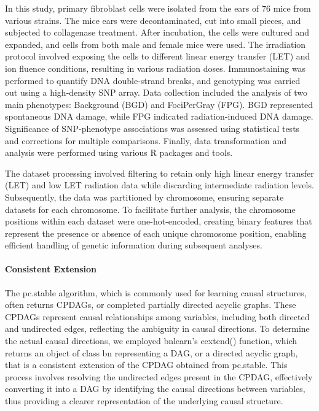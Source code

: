 \documentclass{article}
\begin{document}
In this study, primary fibroblast cells were isolated from the ears of 76 mice from various strains. The mice ears were decontaminated, cut into small pieces, and subjected to collagenase treatment. After incubation, the cells were cultured and expanded, and cells from both male and female mice were used. The irradiation protocol involved exposing the cells to different linear energy transfer (LET) and ion fluence conditions, resulting in various radiation doses. Immunostaining was performed to quantify DNA double-strand breaks, and genotyping was carried out using a high-density SNP array. Data collection included the analysis of two main phenotypes: Background (BGD) and FociPerGray (FPG). BGD represented spontaneous DNA damage, while FPG indicated radiation-induced DNA damage. Significance of SNP-phenotype associations was assessed using statistical tests and corrections for multiple comparisons. Finally, data transformation and analysis were performed using various R packages and tools.

The dataset processing involved filtering to retain only high linear energy transfer (LET) and low LET radiation data while discarding intermediate radiation levels. Subsequently, the data was partitioned by chromosome, ensuring separate datasets for each chromosome. To facilitate further analysis, the chromosome positions within each dataset were one-hot-encoded, creating binary features that represent the presence or absence of each unique chromosome position, enabling efficient handling of genetic information during subsequent analyses.

\paragraph{Consistent Extension}
The pc.stable algorithm, which is commonly used for learning causal structures, often returns CPDAGs, or completed partially directed acyclic graphs. These CPDAGs represent causal relationships among variables, including both directed and undirected edges, reflecting the ambiguity in causal directions. To determine the actual causal directions, we employed bnlearn's cextend() function, which returns an object of class bn representing a DAG, or a directed acyclic graph, that is a consistent extension of the CPDAG obtained from pc.stable. This process involves resolving the undirected edges present in the CPDAG, effectively converting it into a DAG by identifying the causal directions between variables, thus providing a clearer representation of the underlying causal structure.
\end{document}
